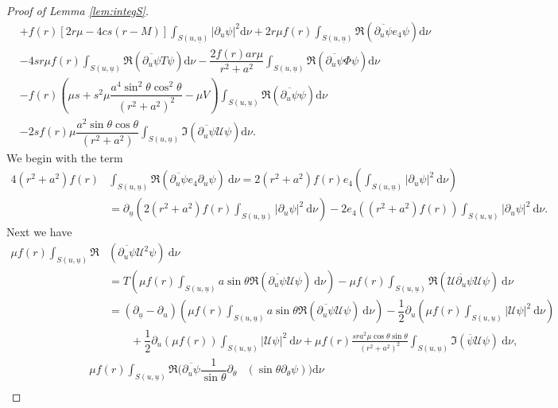 \documentclass[reqno]{amsart}
\numberwithin{equation}{section}
\newcommand{\ubar}{{\underline{u}}}
\newcommand{\dee}{\mathrm{d}}
\theoremstyle{plain}
\theoremstyle{definition}
\theoremstyle{remark}
\numberwithin{equation}{section}
\begin{document}
\begin{proof}[Proof of Lemma \ref{lem:integS}]
\begin{align*}
    &+f(r) [2r\mu -4cs(r-M)]\int_{{S(u,\ubar)}}|\partial_u\psi|^2\dee\nu+ 2r\mu f(r)\int_{{S(u,\ubar)}}\mathfrak{R}(\overline{\partial_u\psi}e_4\psi)\dee\nu\\
    &-4sr\mu f(r)\int_{{S(u,\ubar)}}\mathfrak{R}(\overline{\partial_u\psi}T\psi)\dee\nu-\dfrac{2f(r)ar\mu }{r^2+a^2}\int_{{S(u,\ubar)}}\mathfrak{R}(\overline{\partial_u\psi}\Phi\psi)\dee\nu\\
    &-f(r)\left(\mu s+s^2\mu\dfrac{a^4\sin^2\theta\cos^2\theta}{(r^2+a^2)^2}-\mu V\right)\int_{{S(u,\ubar)}}\mathfrak{R}(\overline{\partial_u\psi}\psi)\dee\nu\\
    &-2sf(r)\mu\dfrac{a^2\sin\theta\cos\theta}{(r^2+a^2)}\int_{{S(u,\ubar)}}\mathfrak{I}(\overline{\partial_u\psi}\mathcal{U}\psi)\dee\nu.
\end{align*}
We begin with the term 
\begin{align*}
    4(r^2+a^2)f(r)&\int_{{S(u,\ubar)}}\mathfrak{R}(\overline{\partial_u\psi} e_4\partial_u\psi)\:\dee\nu=2(r^2+a^2)f(r)e_4\left(\int_{{S(u,\ubar)}} |\partial_u\psi|^2\:\dee\nu\right)\\
    &=\partial_\ubar\left(2(r^2+a^2)f(r)\int_{{S(u,\ubar)}} |\partial_u\psi|^2\:\dee\nu\right)-2e_4((r^2+a^2)f(r))\int_{{S(u,\ubar)}} |\partial_u\psi|^2\:\dee\nu.
\end{align*}
Next we have
\begin{align*}
    \mu f(r)\int_{{S(u,\ubar)}} \mathfrak{R}&(\overline{\partial_u\psi} \mathcal{U}^2\psi)\:\dee\nu\\
    &=T\left(\mu f(r)\int_{{S(u,\ubar)}}a\sin\theta\mathfrak{R}(\overline{\partial_u\psi}\mathcal{U}\psi)\:\dee\nu\right)-\mu f(r)\int_{{S(u,\ubar)}}\mathfrak{R}(\overline{\mathcal{U}\partial_u\psi} \mathcal{U}\psi)\:\dee\nu\\
    &=(\partial_\ubar-\partial_u)\left(\mu f(r)\int_{{S(u,\ubar)}}a\sin\theta\mathfrak{R}(\overline{\partial_u\psi}\mathcal{U}\psi)\:\dee\nu\right)-\dfrac{1}{2}\partial_u\left(\mu f(r)\int_{{S(u,\ubar)}}|\mathcal{U}\psi|^2\:\dee\nu\right)\\
    &\quad\quad+\dfrac{1}{2}\partial_u(\mu f(r))\int_{{S(u,\ubar)}}|\mathcal{U}\psi|^2\:\dee\nu+\mu f(r)\frac{sra^2\mu\cos\theta\sin\theta}{(r^2+a^2)^2}\int_{{S(u,\ubar)}}\mathfrak{I}(\overline{\psi} \mathcal{U}\psi)\:\dee\nu,
\end{align*}
\begin{align*}
    \mu f(r)\int_{{S(u,\ubar)}}\mathfrak{R}\Bigg(\overline{\partial_u\psi}\dfrac{1}{\sin\theta}\partial_\theta&(\sin\theta\partial_\theta\psi)\Bigg)\dee\nu\\

\end{align*}
\end{proof}
\end{document}
